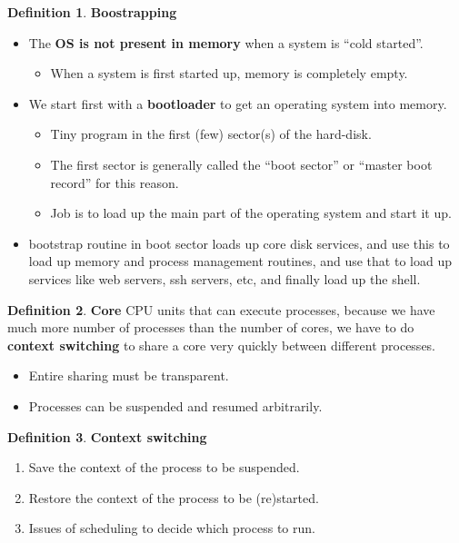 \documentclass[12pt,a4paper]{article}
\theoremstyle{definition}
\newtheorem{definition}{Definition}[section]
\newenvironment{myitemize}
{ \begin{itemize}
    \setlength{\itemsep}{5pt}
    \setlength{\parskip}{0pt}
    \setlength{\parsep}{0pt}     }
{ \end{itemize}                  }
\newenvironment{myenumerate}
{ \begin{enumerate}
    \setlength{\itemsep}{5pt}
    \setlength{\parskip}{0pt}
    \setlength{\parsep}{0pt}     }
{ \end{enumerate}                }
\begin{document}
\begin{definition}{\textbf{Boostrapping}}
	\begin{myitemize}
	\item The \textbf{OS is not present in memory} when a system is “cold started”.
	\begin{myitemize}
		\item When a system is first started up, memory is completely empty.
	\end{myitemize}
	\item We start first with a \textbf{bootloader} to get an operating system into memory.
	\begin{myitemize}
	\item Tiny program in the first (few) sector(s) of the hard-disk.
	\item The first sector is generally called the “boot sector” or “master boot record” for this reason.
	\item Job is to load up the main part of the operating system and start it up.
	\end{myitemize}
	\item bootstrap routine in boot sector loads up core disk services, and use this to load up memory and process management routines, and use that to load up services like web servers, ssh servers, etc, and finally load up the shell.
\end{myitemize}
\end{definition}

\begin{definition}{\textbf{Core}}
	CPU units that can execute processes, because we have much more number of processes than the number of cores, we have to do \textbf{context switching} to share a core very quickly between different processes.
	\begin{myitemize}
		\item Entire sharing must be transparent.
		\item Processes can be suspended and resumed arbitrarily.
	\end{myitemize}
\end{definition}

\begin{definition}{\textbf{Context switching}}
	\begin{myenumerate}
		\item Save the \textsf{context} of the process to be suspended.
		\item Restore the \textsf{context} of the process to be (re)started.
		\item Issues of \textsf{scheduling} to decide which process to run.
	\end{myenumerate}
\end{definition}
\end{document}
